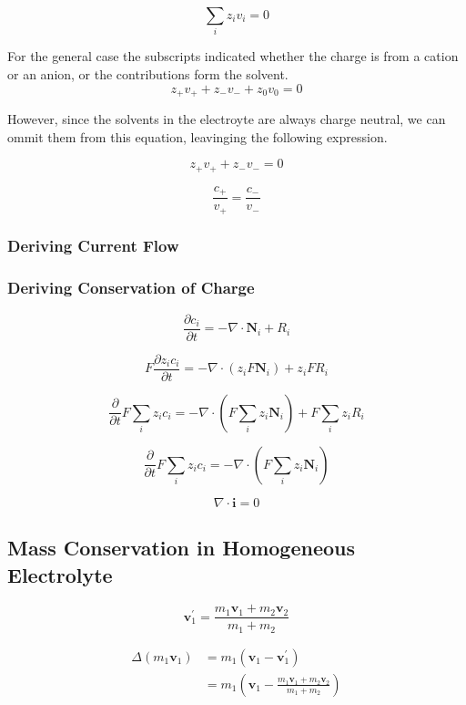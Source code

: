 \documentclass[lettersize,journal]{IEEEtran}
\begin{document}
\[
\sum_{i} z_{i} v_{i}=0
\]

For the general case the subscripts indicated whether the charge is from a cation or an anion, or the contributions form the solvent.
\[
z_{+} v_{+}+z_{-} v_{-}+z_{0} v_{0}=0
\]

However, since the solvents in the electroyte are always charge neutral, we can ommit them from this equation, leavinging the following expression.

\[
z_{+} v_{+}+z_{-} v_{-}=0
\]

\[
\frac{c_{+}}{v_{+}}=\frac{c_{-}}{v_{-}}
\]


\subsubsection{ Deriving Current Flow }

\subsubsection{ Deriving Conservation of Charge }

\[
\frac{\partial c_{i}}{\partial t}=-\nabla \cdot \mathbf{N}_{i}+R_{i}
\]


\[
F \frac{\partial z_{i} c_{i}}{\partial t}=-\nabla \cdot\left(z_{i} F \mathbf{N}_{i}\right)+z_{i} F R_{i}
\]


\[
\frac{\partial}{\partial t} F \sum_{i} z_{i} c_{i}=-\nabla \cdot\left(F \sum_{i} z_{i} \mathbf{N}_{i}\right)+F \sum_{i} z_{i} R_{i}
\]

\[
\frac{\partial}{\partial t} F \sum_{i} z_{i} c_{i}=-\nabla \cdot\left(F \sum_{i} z_{i} \mathbf{N}_{i}\right)
\]

\[
\nabla \cdot \mathbf{i}=0
\]














\subsection{Mass Conservation in Homogeneous Electrolyte}

\[
\mathbf{v}_{1}^{\prime}=\frac{m_{1} \mathbf{v}_{1}+m_{2} \mathbf{v}_{2}}{m_{1}+m_{2}}
\]

\[
\begin{aligned}
\Delta\left(m_{1} \mathbf{v}_{1}\right) &=m_{1}\left(\mathbf{v}_{1}-\mathbf{v}_{1}^{\prime}\right) \\
&=m_{1}\left(\mathbf{v}_{1}-\frac{m_{1} \mathbf{v}_{1}+m_{2} \mathbf{v}_{2}}{m_{1}+m_{2}}\right)
\end{aligned}
\]
\end{document}
